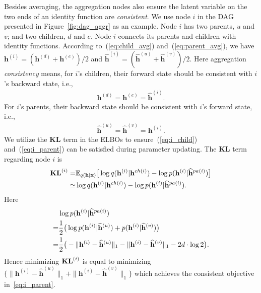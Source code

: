 \documentclass[sigconf, anonymous, review]{acmart}
\theoremstyle{plain}
\theoremstyle{definition}
\theoremstyle{remark}
\begin{document}
Besides averaging, the aggregation nodes also ensure the latent variable on the two ends of an identity function are \emph{consistent}. We use node $i$ in the DAG presented in Figure~\ref{fig:dag_aggr} as an example. Node $i$ has two parents, $u$ and $v$; and two children, $d$ and $e$. Node $i$  connects its parents and children with identity functions. According to~(\ref{eq:child_avg}) and~(\ref{eq:parent_avg}), we have $\mathbf{h}^{(i)} = (\mathbf{h}^{(d)}+\mathbf{h}^{(e)})/2$  and $\widehat{\mathbf{h}}^{(i)} = (\widehat{\mathbf{h}}^{(u)}+\widehat{\mathbf{h}}^{(v)})/2$.
Here aggregation \emph{consistency} means, for $i$'s children, their forward state should be consistent with $i$'s backward state, i.e., 
{
\begin{align}\label{eq:i_child}
\mathbf{h}^{(d)} = \mathbf{h}^{(e)} = \widehat{\mathbf{h}}^{(i)} .
\end{align}} 
For $i$'s parents, their backward state should be consistent with $i$'s forward state, i.e.,
\begin{align}\label{eq:i_parent}
\widehat{\mathbf{h}}^{(u)}  = \widehat{\mathbf{h}}^{(v)}  = \mathbf{h}^{(i)} .
\end{align}%
We utilize the $\mathbf{KL}$ term in the ELBOs to ensure~(\ref{eq:i_child}) and~(\ref{eq:i_parent}) can be satisfied during parameter updating. The $\mathbf{KL}$ term regarding node $i$ is
\begin{align*}%
\textbf{\text{KL}}^{(i)} = & \mathbb{E}_{q(\mathbf{h}|\mathbf{x})}\big[  \log q(\mathbf{h}^{(i)}|\mathbf{h}^{ch(i)})  - \log p(\mathbf{h}^{(i)}|\widehat{\mathbf{h}}^{pa(i)}) \big]  \\ \notag
\simeq  & \log q(\mathbf{h}^{(i)}|\mathbf{h}^{ch(i)})  - \log p(\mathbf{h}^{(i)}|\widehat{\mathbf{h}}^{pa(i)}).
\end{align*} %
Here 
{%
\begin{align} \notag
&\log p(\mathbf{h}^{(i)}|\widehat{\mathbf{h}}^{pa(i)}) \\ \notag
= &\frac{1}{2}\big(\log p(\mathbf{h}^{(i)}|\widehat{\mathbf{h}}^{(u)}) + p(\mathbf{h}^{(i)}|\widehat{\mathbf{h}}^{(v)})\big)\\ \notag
=& \frac{1}{2}\big(-\|\mathbf{h}^{(i)}- \widehat{\mathbf{h}}^{(u)}\|_1 -\|\mathbf{h}^{(i)}- \widehat{\mathbf{h}}^{(v)}\|_1-2d\cdot\log2 \big).
\end{align}}
Hence minimizing $\textbf{\text{KL}}^{(i)}$ is equal to minimizing $\{\|\mathbf{h}^{(i)}- \widehat{\mathbf{h}}^{(u)}\|_1 + \|\mathbf{h}^{(i)}- \widehat{\mathbf{h}}^{(v)}\|_1 \}$ which achieves the consistent objective in~\eqref{eq:i_parent}. 
\end{document}
